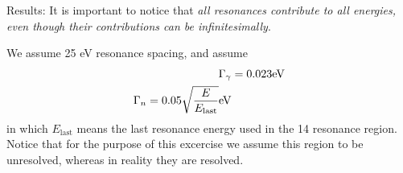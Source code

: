 \documentclass{school-22.211-notes}
\begin{document}
Results: It is important to notice that \textit{all resonances contribute to all energies, even though their contributions can be infinitesimally}. 

We assume 25 eV resonance spacing, and assume
\begin{align}
\Gamma_{\gamma} &= 0.023 \mathrm{eV} \\
\Gamma_{n} = 0.05 \sqrt{\frac{E}{E_{\mathrm{last}}}}  \mathrm{eV}
\end{align}
in which $E_{\mathrm{last}}$ means the last resonance energy used in the 14 resonance region. Notice that for the purpose of this excercise we assume this region to be unresolved, whereas in reality they are resolved. 
\end{document}
